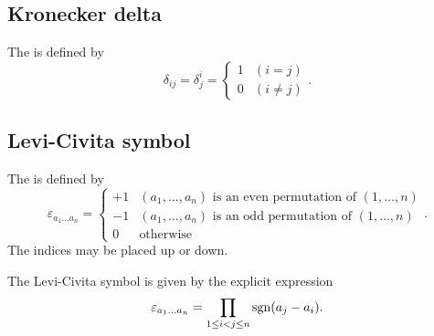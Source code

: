 \subsection{Kronecker delta}
\begin{definition}
The  is defined by
\[ \delta_{ij} = \delta^i_j = \begin{cases}
1 & (i=j) \\
0 & (i \neq j)
\end{cases}.\]
\end{definition}
\subsection{Levi-Civita symbol}
\begin{definition}
The  is defined by
\[ \varepsilon_{a_{1}\ldots a_{n}} = \begin{cases}
+1 & \text{$(a_{1},\ldots, a_{n})$ is an even permutation of $(1,\ldots, n)$} \\
-1 & \text{$(a_{1},\ldots, a_{n})$ is an odd permutation of $(1,\ldots, n)$} \\
0 & \text{otherwise}
\end{cases}.\]
The indices may be placed up or down.
\end{definition}

\begin{lemma} \label{lemma:LeviCivitaProduct}
The Levi-Civita symbol is given by the explicit expression
\[ \varepsilon_{a_{1}\ldots a_{n}} = \prod_{1\leq i<j\leq n}\operatorname{sgn}(a_j-a_i).\]
\end{lemma}

